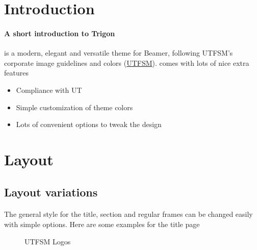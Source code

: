 
\section{Introduction}
\begin{frame}{\insertsectionhead}
  \framesubtitle{A short introduction to Trigon}
  \themename is a modern, elegant and versatile theme for Beamer, following UTFSM's
  corporate image guidelines and colors
  (\href{https://www.usm.cl}{\textsc{UTFSM}}). 
  \vfill
  \themename comes with lots of nice extra features
  \begin{itemize}
    \item Compliance with UT
    \item Simple customization of theme colors
    \item Lots of convenient options to tweak the design
  \end{itemize}
\end{frame}


\section{Layout}

\subsection{Layout variations}

\begin{frame}[fragile=singleslide]{\insertsectionhead}
  \framesubtitle{\insertsubsectionhead}
  The general style for the title, section and regular frames can be changed
  easily with simple options. Here are some examples for the title page

\begin{figure}
\centering     %
{}

\caption{UTFSM Logos}
\end{figure}

\end{frame}

